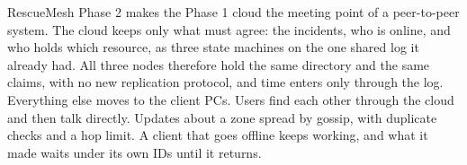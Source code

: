 RescueMesh Phase 2 makes the Phase 1 cloud the meeting point of a peer-to-peer system. The cloud keeps only what must agree: the incidents, who is online, and who holds which resource, as three state machines on the one shared log it already had. All three nodes therefore hold the same directory and the same claims, with no new replication protocol, and time enters only through the log. Everything else moves to the client PCs. Users find each other through the cloud and then talk directly. Updates about a zone spread by gossip, with duplicate checks and a hop limit. A client that goes offline keeps working, and what it made waits under its own IDs until it returns.

\tbd{}
